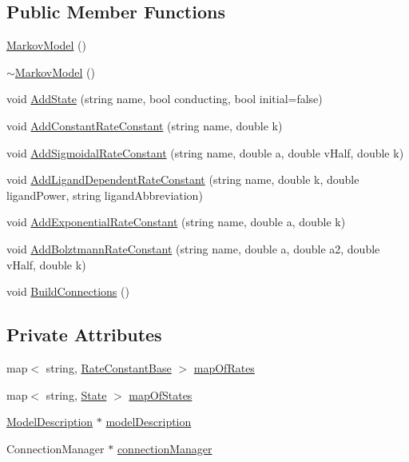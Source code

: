 \subsection*{Public Member Functions}
\begin{DoxyCompactItemize}
\item 
\hyperlink{classMarkovModel_a78d9bb5082c4ca6d073d3f85b5724ec6}{MarkovModel} ()
\item 
\hyperlink{classMarkovModel_a793d422bad65797be59bc498b5244ccd}{$\sim$MarkovModel} ()
\item 
void \hyperlink{classMarkovModel_a05ee51096db3a9e5f99023a95f3a94c2}{AddState} (string name, bool conducting, bool initial=false)
\item 
void \hyperlink{classMarkovModel_a3a745b51845e7f2e143865a0e9b9b5c9}{AddConstantRateConstant} (string name, double k)
\item 
void \hyperlink{classMarkovModel_a6fd9d54968966763f121864765e1520a}{AddSigmoidalRateConstant} (string name, double a, double vHalf, double k)
\item 
void \hyperlink{classMarkovModel_a11a2021632cec3e65dd42fde69624b0c}{AddLigandDependentRateConstant} (string name, double k, double ligandPower, string ligandAbbreviation)
\item 
void \hyperlink{classMarkovModel_afb18b6980e5240e59d1f9fb334c95256}{AddExponentialRateConstant} (string name, double a, double k)
\item 
void \hyperlink{classMarkovModel_a387e958195aa614d0c8210f1e12abb31}{AddBolztmannRateConstant} (string name, double a, double a2, double vHalf, double k)
\item 
void \hyperlink{classMarkovModel_a059fde492604827abdf90fcd32889f5c}{BuildConnections} ()
\end{DoxyCompactItemize}
\subsection*{Private Attributes}
\begin{DoxyCompactItemize}
\item 
map$<$ string, \hyperlink{classRateConstantBase}{RateConstantBase} $>$ \hyperlink{classMarkovModel_aacb8c8d6db1b31efeb05947a1421426e}{mapOfRates}
\item 
map$<$ string, \hyperlink{classState}{State} $>$ \hyperlink{classMarkovModel_a291cff9e856b3b348fbee694c344c219}{mapOfStates}
\item 
\hyperlink{classModelDescription}{ModelDescription} $\ast$ \hyperlink{classMarkovModel_acb12261525cf0a48bb92d10078a94fbc}{modelDescription}
\item 
ConnectionManager $\ast$ \hyperlink{classMarkovModel_a1cb9169b2ffa849a71aeb4c65411505b}{connectionManager}
\end{DoxyCompactItemize}


